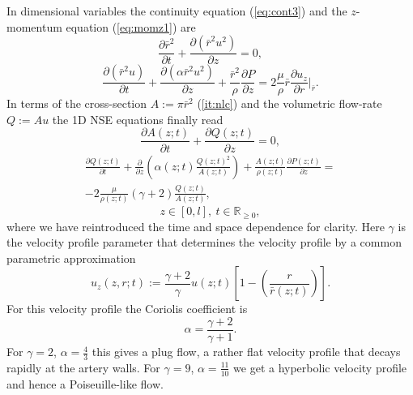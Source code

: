 \documentclass[a4paper, oneside]{discothesis}
\begin{document}
In dimensional variables the continuity equation (\autoref{eq:cont3}) and the $z$-momentum equation (\autoref{eq:momz1}) are
\begin{equation}
	\frac{\partial \bar{r}^2}{\partial t} + \frac{\partial (\bar{r}^2 u^2)}{\partial z} = 0,
\end{equation}
\begin{equation}
	\frac{\partial (\bar{r}^2 u)}{\partial t} + \frac{\partial (\alpha \bar{r}^2 u^2) }{\partial z} + \frac{\bar{r}^2}{\rho} \frac{\partial P}{\partial z} = 2 \frac{\mu}{\rho} \bar{r} \frac{\partial u_z}{\partial r} |_{\bar{r}}.
\end{equation}
In terms of the cross-section $A := \pi \bar{r}^2$ (\autoref{it:nlc}) and the volumetric flow-rate $Q := Au$ the 1D NSE equations finally read
\begin{equation}
		\frac{\partial A(z;t)}{\partial t} + \frac{\partial Q(z;t)}{\partial z} = 0, \label{eq:1deqs1}
\end{equation}
\begin{multline}
		\frac{\partial Q(z;t)}{\partial t} + \frac{\partial}{\partial z}\left(\alpha(z;t) \frac{Q(z;t)^2}{A(z;t)} \right) + \frac{A(z;t)}{\rho(z;t)} \frac{\partial P(z;t)}{\partial z} = \\
		-2 \frac{\mu}{\rho(z;t)} ( \gamma + 2 ) \frac{Q(z;t)}{A(z;t)}, \label{eq:1deqs2}
\end{multline}
\begin{equation}
		z \in [0,l],\  t \in \mathbb{R}_{\geq 0}, 
\end{equation}
where we have reintroduced the time and space dependence for clarity.
Here $\gamma$ is the velocity profile parameter that determines the velocity profile by a common parametric approximation 
\begin{equation}
	u_z(z,r;t) := \frac{\gamma + 2}{\gamma} u(z;t) \left[ 1 - \left( \frac{r}{\bar{r}(z;t)} \right) \right].
\end{equation}
For this velocity profile the Coriolis coefficient is
\begin{equation}
	\alpha = \frac{\gamma + 2}{\gamma + 1}.
\end{equation}
For $\gamma=2$, $\alpha = \frac{4}{3}$ this gives a plug flow, a rather flat velocity profile that decays rapidly at the artery walls.
For $\gamma=9$, $\alpha = \frac{11}{10} $ we get a hyperbolic velocity profile and hence a Poiseuille-like flow. \cite{köppl2023dimension} \cite{barnard1966theory}
\end{document}
